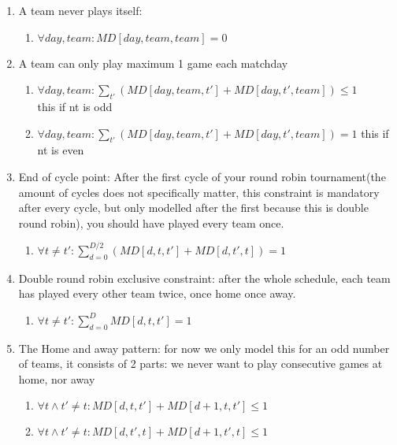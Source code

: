 \documentclass[titlepage]{article}%
\begin{document}
\begin{enumerate}
 \item A team never plays itself: 
 \begin{enumerate}
 \item $\forall day,team : MD[day,team,team] = 0$
 \end{enumerate}
 
 \item A team can only play maximum 1 game each matchday
 \begin{enumerate}
 \item $\forall day,team : \sum\nolimits_{t'} ( MD[day,team,t'] + MD[day, t',team]) \leq 1$ \\
 this if nt is odd
 \item $\forall day,team : \sum\nolimits_{t'} ( MD[day,team,t'] + MD[day, t',team]) = 1 $ 
 this if nt is even 
 \end{enumerate}
 
 \item End of cycle point: After the first cycle of your round robin tournament(the amount of cycles does not specifically matter, this constraint is mandatory after every cycle, but only modelled after the first because this is double round robin), you should have played every team once.
 
 \begin{enumerate}
 \item $\forall t \neq t': \sum\limits_{d=0}^{D/2} (MD[d,t,t'] + MD[d,t',t]) = 1$
 \end{enumerate}
 
 \item Double round robin exclusive constraint: after the whole schedule, each team has played every other team twice, once home once away. 
 \begin{enumerate}
 \item $\forall t \neq t': \sum\limits_{d=0}^{D} MD[d,t,t'] = 1$
 \end{enumerate}

 \item The Home and away pattern: for now we only model this for an odd number of teams, it consists of 2 parts: we never want to play consecutive games at home, nor away
 \begin{enumerate}
  \item $\forall t \land t'\neq t: MD[d,t,t'] + MD[d+1,t,t'] \leq 1$
  \item $\forall t \land t'\neq t: MD[d,t',t] + MD[d+1,t',t] \leq 1$
 \end{enumerate}
\end{enumerate}   
\end{document}
